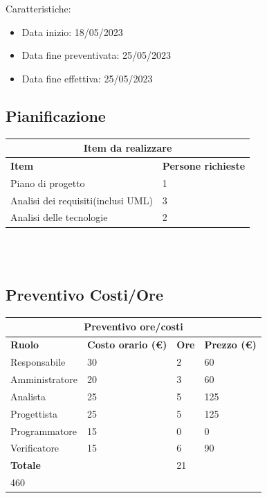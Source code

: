 \documentclass[12pt]{article}
\begin{document}
Caratteristiche:
\begin{itemize}
    \item Data inizio: 18/05/2023
    \item Data fine preventivata: 25/05/2023
    \item Data fine effettiva: 25/05/2023
\end{itemize}

\subsection{Pianificazione}
\begin{center}
    \begin{tabularx}{\textwidth}{|X|X|}
        \hline
        \multicolumn{2}{|c|}{\textbf{Item da realizzare}}\\
        \hline
        \hline
        \textbf{Item} & \textbf{Persone richieste}\\
        \hline
        Piano di progetto & 1\\
        \hline
        Analisi dei requisiti(inclusi UML) & 3 \\
        \hline
        Analisi delle tecnologie & 2 \\
        \hline
    \end{tabularx}\\[8pt]
    \mbox{}\\
\end{center}
\subsection{Preventivo Costi/Ore}
\begin{center}
    \begin{tabularx}{\textwidth}{|X|X|X|X|}
        \hline
        \multicolumn{4}{|c|}{\textbf{Preventivo ore/costi}}\\
        \hline
        \hline
        \textbf{Ruolo} & \textbf{Costo orario (\euro)} & \textbf{Ore} & \textbf{Prezzo (\euro)}\\
        \hline
        Responsabile    & 30 & 2  & 60\\   
        \hline
        Amministratore  & 20 & 3  & 60\\ 
        \hline
        Analista        & 25 & 5  & 125\\ 
        \hline
        Progettista     & 25 & 5  & 125\\
        \hline
        Programmatore   & 15 & 0  & 0\\
        \hline
        Verificatore    & 15 & 6  & 90\\
        \hline
        \hline
        \textbf{Totale} &    & 21 & \\ 460\\
        \hline
    \end{tabularx}\\[8pt]
    \mbox{}\\
\end{center}
\end{document}
